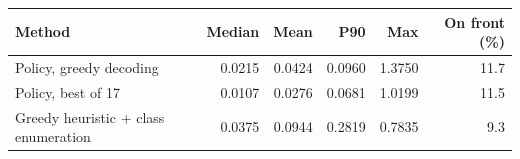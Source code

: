 \begin{tabular}{lrrrrr}
\toprule
Method & Median & Mean & P90 & Max & On front (\%)\\
\midrule
Policy, greedy decoding & 0.0215 & 0.0424 & 0.0960 & 1.3750 & 11.7\\
Policy, best of 17 & 0.0107 & 0.0276 & 0.0681 & 1.0199 & 11.5\\
Greedy heuristic + class enumeration & 0.0375 & 0.0944 & 0.2819 & 0.7835 & 9.3\\
\bottomrule
\end{tabular}
